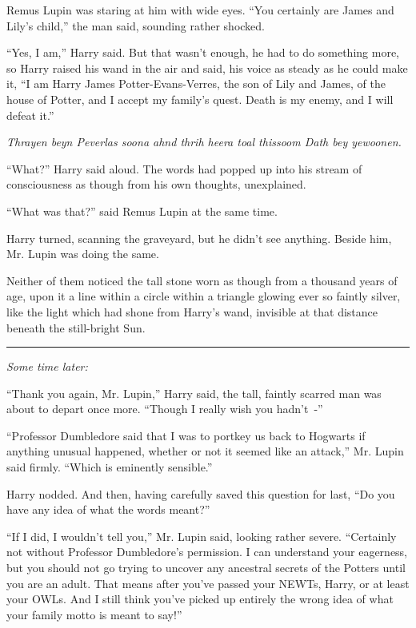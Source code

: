 Remus Lupin was staring at him with wide eyes. ``You certainly are James and Lily's child,'' the man said, sounding rather shocked.

``Yes, I am,'' Harry said. But that wasn't enough, he had to do something more, so Harry raised his wand in the air and said, his voice as steady as he could make it, ``I am Harry James Potter-Evans-Verres, the son of Lily and James, of the house of Potter, and I accept my family's quest. Death is my enemy, and I will defeat it.''

\emph{Thrayen beyn Peverlas soona ahnd thrih heera toal thissoom Dath bey yewoonen.}

``What?'' Harry said aloud. The words had popped up into his stream of consciousness as though from his own thoughts, unexplained.

``What was that?'' said Remus Lupin at the same time.

Harry turned, scanning the graveyard, but he didn't see anything. Beside him, Mr. Lupin was doing the same.

Neither of them noticed the tall stone worn as though from a thousand years of age, upon it a line within a circle within a triangle glowing ever so faintly silver, like the light which had shone from Harry's wand, invisible at that distance beneath the still-bright Sun.

\begin{center}\rule{3in}{0.4pt}\end{center}

\emph{Some time later:}

``Thank you again, Mr. Lupin,'' Harry said, the tall, faintly scarred man was about to depart once more. ``Though I really wish you hadn't~-''

``Professor Dumbledore said that I was to portkey us back to Hogwarts if anything unusual happened, whether or not it seemed like an attack,'' Mr. Lupin said firmly. ``Which is eminently sensible.''

Harry nodded. And then, having carefully saved this question for last, ``Do you have any idea of what the words meant?''

``If I did, I wouldn't tell you,'' Mr. Lupin said, looking rather severe. ``Certainly not without Professor Dumbledore's permission. I can understand your eagerness, but you should not go trying to uncover any ancestral secrets of the Potters until you are an adult. That means after you've passed your NEWTs, Harry, or at least your OWLs. And I still think you've picked up entirely the wrong idea of what your family motto is meant to say!''

